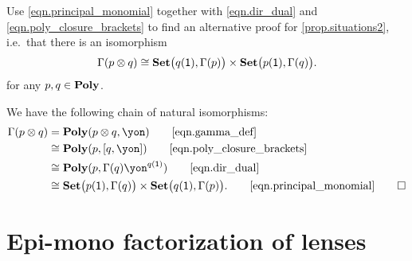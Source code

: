\documentclass[Book-Poly]{subfiles}
\begin{document}
\begin{exercise}
Use \eqref{eqn.principal_monomial} together with \eqref{eqn.dir_dual} and \eqref{eqn.poly_closure_brackets} to find an alternative proof for \cref{prop.situations2}, i.e.\ that there is an isomorphism
\[
    \Gamma(p\otimes q) \cong \mathbf{Set}\big(q(\textsf{1}),\Gamma(p)\big) \times \mathbf{Set}\big(p(\textsf{1}),\Gamma(q)\big).
\]
for any $p,q\in\mathbf{Poly}$.
\begin{solution}
We have the following chain of natural isomorphisms:
\begin{align*}
	\Gamma(p \otimes q) &=
	\poly(p \otimes q,\yon) 
	\tag*{\eqref{eqn.gamma_def}} \\
	&\iso
	\poly(p, \ihom{q,\yon}) 
	\tag*{\eqref{eqn.poly_closure_brackets}} \\
	&\iso
	\poly(p, \Gamma(q)\yon^{q(\1)})
	\tag*{\eqref{eqn.dir_dual}} \\
	&\iso
	\smset\big(p(\1),\Gamma(q)\big) \times \smset\big(q(\1),\Gamma(p)\big).
	\tag*{\eqref{eqn.principal_monomial}}
\qedhere
\end{align*}
\end{solution}
\end{exercise}

\section{Epi-mono factorization of lenses}
\end{document}
